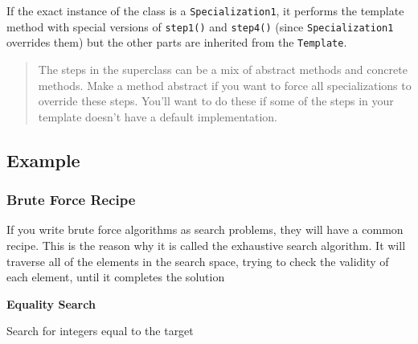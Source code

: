 If the exact instance of the class is a \texttt{Specialization1}, it
performs the template method with special versions of \texttt{step1()}
and \texttt{step4()} (since \texttt{Specialization1} overrides them) but
the other parts are inherited from the \texttt{Template}.

\begin{quote}
The steps in the superclass can be a mix of abstract methods and
concrete methods. Make a method abstract if you want to force all
specializations to override these steps. You'll want to do these if some
of the steps in your template doesn't have a default implementation.
\end{quote}

\subsection{Example}\label{behavioral-patterns.md__example-4}

\subsubsection{Brute Force
Recipe}\label{behavioral-patterns.md__brute-force-recipe}

If you write brute force algorithms as search problems, they will have a
common recipe. This is the reason why it is called the exhaustive search
algorithm. It will traverse all of the elements in the search space,
trying to check the validity of each element, until it completes the
solution

\textbf{Equality Search}

Search for integers equal to the target

\begin{Shaded}
\begin{Highlighting}[]

\OperatorTok{=} 
\OperatorTok{=}\NormalTok{ []}
\OperatorTok{=}\NormalTok{ searchSpace[}\NormalTok{]}
\OperatorTok{\textless{}}
    \OperatorTok{==}
\OperatorTok{=}\NormalTok{ searchSpace[}\OperatorTok{++}\NormalTok{i]}
    
\end{Highlighting}
\end{Shaded}

